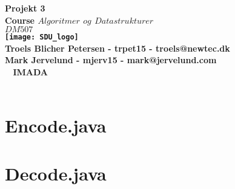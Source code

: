 \documentclass[a4paper,10pt,titlepage]{report}
\date{}
\begin{document}
\begin{titlepage}
\centering
    \vspace*{2\baselineskip}
    \huge
    \bfseries
    Projekt 3 \\

    \normalfont
	\huge
    Course \(Algoritmer\) \(og\) \(Datastrukturer\) \\ \( DM507\)  \\ [3\baselineskip]
    \normalfont
	\texttt{[image: SDU\_logo]}\\ 
	Troels Blicher Petersen - trpet15 - troels@newtec.dk\\
    Mark Jervelund - mjerv15 - mark@jervelund.com \\
    \vfill\
    \vspace{5mm}
    IMADA \\
    \vspace{5mm}
    \textbf{\datedate}  \bf{} \\[2\baselineskip]
\end{titlepage}
\newpage
\renewcommand{\thepage}{\roman{page}}%
\tableofcontents

\newpage
\setcounter{page}{1}
\renewcommand{\thepage}{\arabic{page}}
\section{Encode.java}

\newpage
\section{Decode.java}

\end{document}

